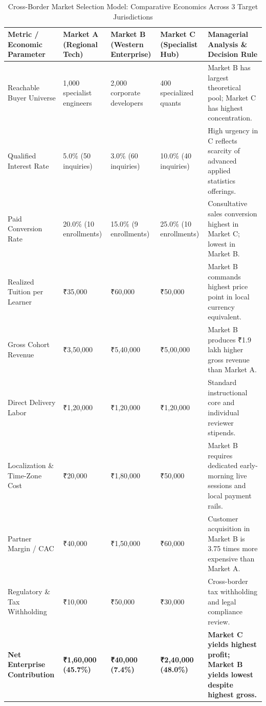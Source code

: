 \begin{table}[t]
\centering
\small
\caption{Cross-Border Market Selection Model: Comparative Economics Across 3 Target Jurisdictions}
\label{tab:cross_border_market_selection}
\begin{tabularx}{\textwidth}{p{3.2cm} p{2.6cm} p{2.6cm} p{2.6cm} X}
\toprule
\textbf{Metric / Economic Parameter} & \textbf{Market A (Regional Tech)} & \textbf{Market B (Western Enterprise)} & \textbf{Market C (Specialist Hub)} & \textbf{Managerial Analysis \& Decision Rule} \\
\midrule
Reachable Buyer Universe & 1,000 specialist engineers & 2,000 corporate developers & 400 specialized quants & Market B has largest theoretical pool; Market C has highest concentration. \\
Qualified Interest Rate & 5.0\% (50 inquiries) & 3.0\% (60 inquiries) & 10.0\% (40 inquiries) & High urgency in C reflects scarcity of advanced applied statistics offerings. \\
Paid Conversion Rate & 20.0\% (10 enrollments) & 15.0\% (9 enrollments) & 25.0\% (10 enrollments) & Consultative sales conversion highest in Market C; lowest in Market B. \\
Realized Tuition per Learner & ₹35,000 & ₹60,000 & ₹50,000 & Market B commands highest price point in local currency equivalent. \\
Gross Cohort Revenue & ₹3,50,000 & ₹5,40,000 & ₹5,00,000 & Market B produces ₹1.9 lakh higher gross revenue than Market A. \\
Direct Delivery Labor & ₹1,20,000 & ₹1,20,000 & ₹1,20,000 & Standard instructional core and individual reviewer stipends. \\
Localization \& Time-Zone Cost & ₹20,000 & ₹1,80,000 & ₹50,000 & Market B requires dedicated early-morning live sessions and local payment rails. \\
Partner Margin / CAC & ₹40,000 & ₹1,50,000 & ₹60,000 & Customer acquisition in Market B is 3.75 times more expensive than Market A. \\
Regulatory \& Tax Withholding & ₹10,000 & ₹50,000 & ₹30,000 & Cross-border tax withholding and legal compliance review. \\
\midrule
\textbf{Net Enterprise Contribution} & \textbf{₹1,60,000 (45.7\%)} & \textbf{₹40,000 (7.4\%)} & \textbf{₹2,40,000 (48.0\%)} & \textbf{Market C yields highest profit; Market B yields lowest despite highest gross.} \\
\bottomrule
\end{tabularx}
\end{table}

